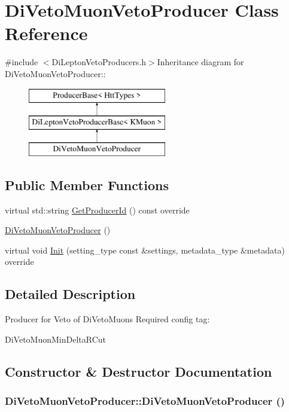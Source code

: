 \hypertarget{classDiVetoMuonVetoProducer}{
\section{DiVetoMuonVetoProducer Class Reference}
\label{classDiVetoMuonVetoProducer}
}


{\ttfamily \#include $<$DiLeptonVetoProducers.h$>$}Inheritance diagram for DiVetoMuonVetoProducer::\begin{figure}[H]
\begin{center}
\leavevmode
\includegraphics[height=3cm]{classDiVetoMuonVetoProducer}
\end{center}
\end{figure}
\subsection*{Public Member Functions}
\begin{DoxyCompactItemize}
\item 
virtual std::string \hyperlink{classDiVetoMuonVetoProducer_a04e4bec0f13bc1262e3e19ada8d1a559}{GetProducerId} () const override
\item 
\hyperlink{classDiVetoMuonVetoProducer_afef0fbd11188b8dbe0da9cf1e626ef5a}{DiVetoMuonVetoProducer} ()
\item 
virtual void \hyperlink{classDiVetoMuonVetoProducer_a094b025b9686518c03836d57fcf943ac}{Init} (setting\_\-type const \&settings, metadata\_\-type \&metadata) override
\end{DoxyCompactItemize}


\subsection{Detailed Description}
Producer for Veto of DiVetoMuons Required config tag:
\begin{DoxyItemize}
\item DiVetoMuonMinDeltaRCut 
\end{DoxyItemize}

\subsection{Constructor \& Destructor Documentation}
\hypertarget{classDiVetoMuonVetoProducer_afef0fbd11188b8dbe0da9cf1e626ef5a}{
\subsubsection[{DiVetoMuonVetoProducer}]{\setlength{\rightskip}{0pt plus 5cm}DiVetoMuonVetoProducer::DiVetoMuonVetoProducer ()}}
\label{classDiVetoMuonVetoProducer_afef0fbd11188b8dbe0da9cf1e626ef5a}


